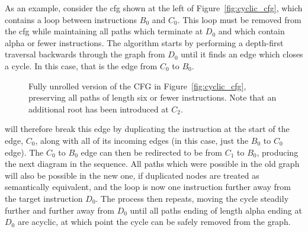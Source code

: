 As an example, consider the \gls{cfg} shown at the left of
Figure~\ref{fig:cyclic_cfg}, which contains a loop between
instructions $B_0$ and $C_0$.  This loop must be removed from the \gls{cfg}
while maintaining all paths which terminate at $D_0$ and which contain
\gls{alpha} or fewer instructions.  The algorithm starts by
performing a depth-first traversal backwards through the graph from
$D_0$ until it finds an edge which closes a cycle.
In this case, that is the edge from $C_0$ to $B_0$.
\begin{wrapfigure}{r}{3.3cm}
\vspace{-3mm}
\caption{Fully unrolled version of the CFG in
  Figure~\ref{fig:cyclic_cfg}, preserving all paths of length six or
  fewer instructions.  Note that an additional root has been
  introduced at $C_2$.}
\vspace{3mm}
\label{fig:unrolled_cyclic_cfg}
\end{wrapfigure}
{\Technique} will therefore break this edge by duplicating the
instruction at the start of the edge, $C_0$, along with all of its
incoming edges (in this case, just the $B_0$ to $C_0$ edge).  The
$C_0$ to $B_0$ edge can then be redirected to be from $C_1$ to $B_0$,
producing the next diagram in the sequence.  All paths which were
possible in the old graph will also be possible in the new one, if
duplicated nodes are treated as semantically equivalent, and the loop
is now one instruction further away from the target instruction $D_0$.
The process then repeats, moving the cycle steadily further and
further away from $D_0$ until all paths ending of length \gls{alpha}
ending at $D_0$ are acyclic, at which point the cycle can be safely
removed from the graph.

